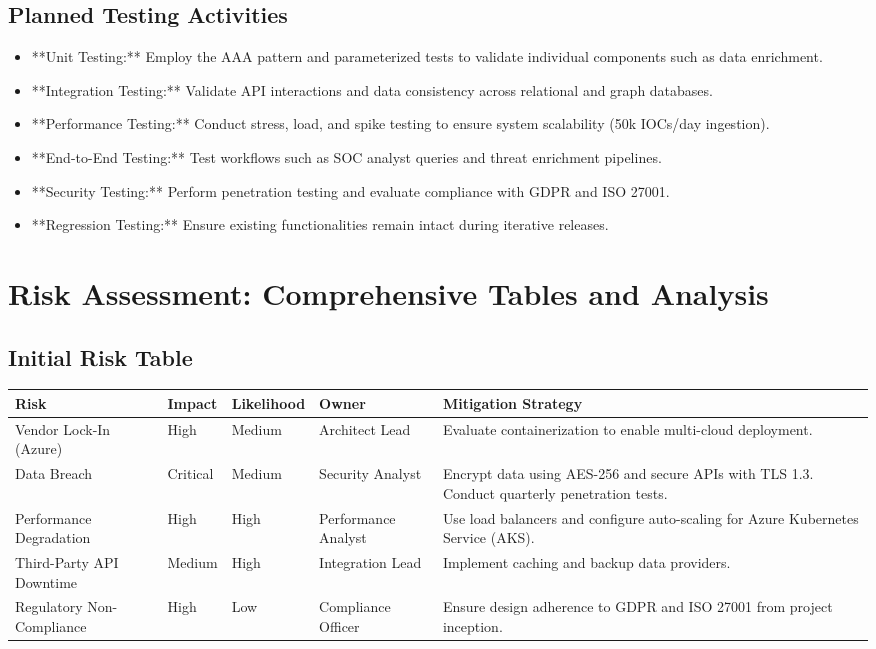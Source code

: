 \documentclass[12pt]{article}
\begin{document}
\subsection{Planned Testing Activities}
\begin{itemize}
    \item **Unit Testing:** Employ the AAA pattern and parameterized tests to validate individual components such as data enrichment.
    \item **Integration Testing:** Validate API interactions and data consistency across relational and graph databases.
    \item **Performance Testing:** Conduct stress, load, and spike testing to ensure system scalability (50k IOCs/day ingestion).
    \item **End-to-End Testing:** Test workflows such as SOC analyst queries and threat enrichment pipelines.
    \item **Security Testing:** Perform penetration testing and evaluate compliance with GDPR and ISO 27001.
    \item **Regression Testing:** Ensure existing functionalities remain intact during iterative releases.
\end{itemize}

\newpage

\section{Risk Assessment: Comprehensive Tables and Analysis}
\subsection{Initial Risk Table}
\begin{longtable}{|p{4cm}|p{3cm}|p{2cm}|p{3cm}|p{4cm}|}
\hline
\textbf{Risk} & \textbf{Impact} & \textbf{Likelihood} & \textbf{Owner} & \textbf{Mitigation Strategy} \\
\hline
Vendor Lock-In (Azure) & High & Medium & Architect Lead & Evaluate containerization to enable multi-cloud deployment. \\
\hline
Data Breach & Critical & Medium & Security Analyst & Encrypt data using AES-256 and secure APIs with TLS 1.3. Conduct quarterly penetration tests. \\
\hline
Performance Degradation & High & High & Performance Analyst & Use load balancers and configure auto-scaling for Azure Kubernetes Service (AKS). \\
\hline
Third-Party API Downtime & Medium & High & Integration Lead & Implement caching and backup data providers. \\
\hline
Regulatory Non-Compliance & High & Low & Compliance Officer & Ensure design adherence to GDPR and ISO 27001 from project inception. \\
\hline
\end{longtable}
\end{document}
